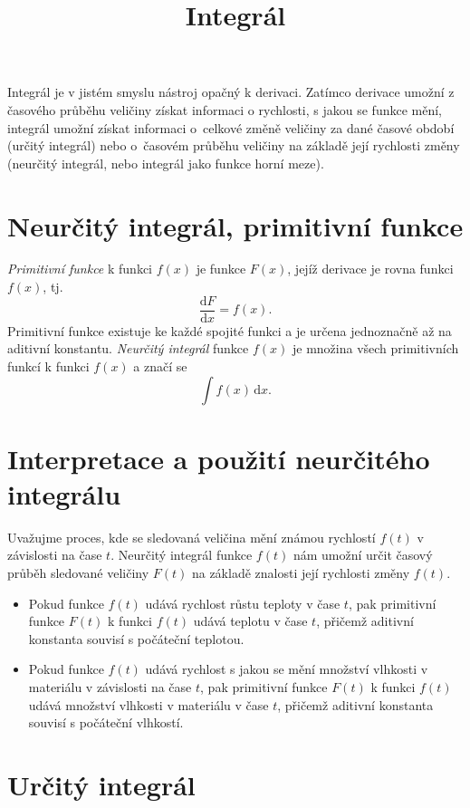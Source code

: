 \documentclass[11pt, reqno]{amsart}
\begin{document}
\title{Integrál}
\maketitle
\thispagestyle{empty}


Integrál je v jistém smyslu nástroj opačný k derivaci. Zatímco derivace umožní z časového průběhu veličiny
získat informaci o rychlosti, s jakou se funkce mění, integrál umožní získat informaci o~celkové změně veličiny
za dané časové období (určitý integrál) nebo o~časovém průběhu veličiny na základě její rychlosti změny (neurčitý integrál, nebo integrál jako funkce horní meze).

\section*{Neurčitý integrál, primitivní funkce}

{\itshape Primitivní funkce} k funkci $f(x)$ je funkce $F(x)$, jejíž derivace je rovna funkci $f(x)$, tj. 
\[\frac{\mathrm dF}{\mathrm dx} = f(x). \tag{1}\] Primitivní funkce existuje ke každé spojité funkci a je určena jednoznačně až na aditivní konstantu.
{\itshape Neurčitý integrál} funkce $f(x)$ je množina všech primitivních funkcí k funkci $f(x)$ a značí se
\[\int f(x) \,\mathrm dx.\]

\section*{Interpretace a použití neurčitého integrálu}

Uvažujme proces, kde se sledovaná veličina mění známou rychlostí $f(t)$ v závislosti na čase $t$.
Neurčitý integrál funkce $f(t)$ nám umožní určit časový průběh sledované veličiny $F(t)$ na základě znalosti její rychlosti změny $f(t)$.

\begin{itemize}
  \item 
Pokud funkce $f(t)$ udává rychlost růstu teploty v čase $t$, pak primitivní funkce $F(t)$ k funkci $f(t)$ udává teplotu v čase $t$, přičemž aditivní konstanta souvisí s počáteční teplotou.
\item
Pokud funkce $f(t)$ udává rychlost s jakou se mění množství vlhkosti v materiálu v závislosti  
na čase $t$, pak primitivní funkce $F(t)$ k funkci $f(t)$ udává množství vlhkosti v materiálu v čase $t$,
přičemž aditivní konstanta souvisí s počáteční vlhkostí.
\end{itemize}

\section*{Určitý integrál}
\end{document}

